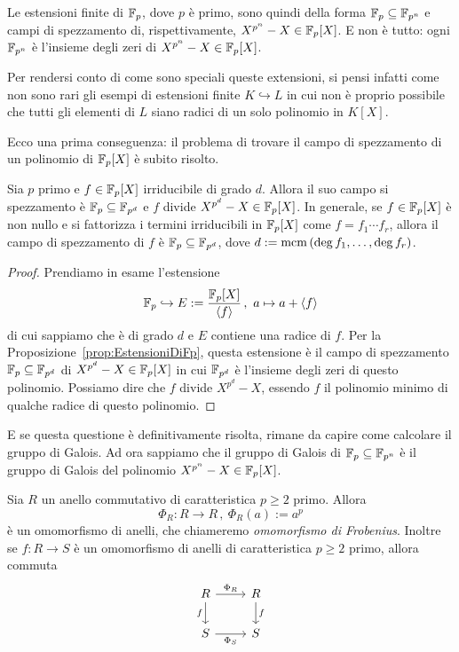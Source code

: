 Le estensioni finite di \(\mathbb{F}_p\), dove \(p\) è primo, sono quindi della forma \(\mathbb{F}_p \subseteq \mathbb{F}_{p^n}\) e campi di spezzamento di, rispettivamente, \(X^{p^n}-X \in \mathbb{F}_p[X]\). E non è tutto: ogni \(\mathbb{F}_{p^n}\) è l'insieme degli zeri di \(X^{p^n}-X \in \mathbb{F}_p[X]\).

Per rendersi conto di come sono speciali queste extensioni, si pensi infatti come non sono rari gli esempi di estensioni finite \(K \hookrightarrow L\) in cui non è proprio possibile che tutti gli elementi di \(L\) siano radici di un solo polinomio in \(K[X]\). 

Ecco una prima conseguenza: il problema di trovare il campo di spezzamento di un polinomio di \(\mathbb{F}_p[X]\) è subito risolto. 

\begin{prop}\label{prop:CampiDiSpezzamentoDaFp}
Sia \(p\) primo e \(f \in \mathbb{F}_p[X]\) irriducibile di grado \(d\). Allora il suo campo si spezzamento è \(\mathbb{F}_p \subseteq \mathbb{F}_{p^d}\) e \(f\) divide \(X^{p^d}-X \in \mathbb{F}_p[X]\). In generale, se \(f \in \mathbb{F}_p[X]\) è non nullo e si fattorizza i termini irriducibili in \(\mathbb{F}_p[X]\) come \(f = f_1 \cdots f_r\), allora il campo di spezzamento di \(f\) è \(\mathbb{F}_p \subseteq \mathbb{F}_{p^d}\), dove \(d := \operatorname{mcm}\left(\deg f_1, \dots{}, \deg f_r\right)\).
\end{prop}

\begin{proof}
Prendiamo in esame l'estensione
\[\mathbb{F}_p \hookrightarrow E := \frac{\mathbb{F}_p[X]}{\left\langle f\right\rangle}\,,\ a \mapsto a + \left\langle f\right\rangle\]
di cui sappiamo che è di grado \(d\) e \(E\) contiene una radice di \(f\). Per la Proposizione~\ref{prop:EstensioniDiFp}, questa estensione è il campo di spezzamento \(\mathbb{F}_p \subseteq \mathbb{F}_{p^d}\) di \(X^{p^d}-X \in \mathbb{F}_p[X]\) in cui \(\mathbb{F}_{p^d}\) è l'insieme degli zeri di questo polinomio. Possiamo dire che \(f\) divide \(X^{p^d}-X\), essendo \(f\) il polinomio minimo di qualche radice di questo polinomio. 
\end{proof}

E se questa questione è definitivamente risolta, rimane da capire come calcolare il gruppo di Galois. Ad ora sappiamo che il gruppo di Galois di \(\mathbb{F}_p \subseteq \mathbb{F}_{p^n}\) è il gruppo di Galois del polinomio \(X^{p^n}-X \in \mathbb{F}_p[X]\).

\begin{lemm}\label{lemm:FreshmansDream}
Sia \(R\) un anello commutativo di caratteristica $p \ge 2$ primo. Allora
\[\Phi_R : R \to R\,,\ \Phi_R(a) := a^p\]
è un omomorfismo di anelli, che chiameremo {\em omomorfismo di Frobenius}. Inoltre se \(f : R \to S\) è un omomorfismo di anelli di caratteristica \(p \ge 2\) primo, allora commuta
\[\begin{tikzcd}
R \ar["f", d, swap] \ar["{\Phi_R}", r] & R \ar["f", d] \\
S \ar["{\Phi_S}", r, swap] & S
\end{tikzcd}\]
\end{lemm}

